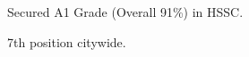 \documentclass[]{resume}
\begin{document}
\begin{minipage}[t]{0.5\textwidth}
    \sectionsep

     
    \begin{tightemize}
        \item Secured A1 Grade (Overall 91\%) in HSSC.
        \item 7th position citywide.
    \end{tightemize}



\end{minipage}
\end{document}
